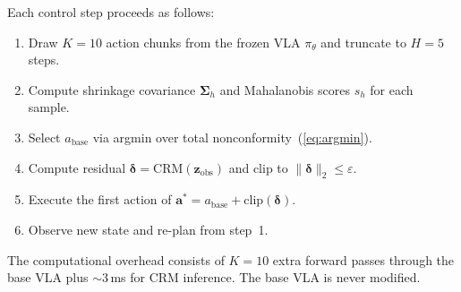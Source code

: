 Each control step proceeds as follows:
\begin{enumerate}[nosep]
  \item Draw $K{=}10$ action chunks from the frozen VLA $\pi_\theta$ and truncate to $H{=}5$ steps.
  \item Compute shrinkage covariance $\boldsymbol{\Sigma}_h$ and Mahalanobis scores $s_h$ for each sample.
  \item Select $a_{\mathrm{base}}$ via argmin over total nonconformity~(\ref{eq:argmin}).
  \item Compute residual $\boldsymbol{\delta} = \mathrm{CRM}(\mathbf{z}_{\mathrm{obs}})$ and clip to $\|\boldsymbol{\delta}\|_2 \leq \varepsilon$.
  \item Execute the first action of $\mathbf{a}^* = a_{\mathrm{base}} + \mathrm{clip}(\boldsymbol{\delta})$.
  \item Observe new state and re-plan from step~1.
\end{enumerate}
The computational overhead consists of $K{=}10$ extra forward passes through the base VLA plus ${\sim}$3\,ms for CRM inference. The base VLA is never modified.
